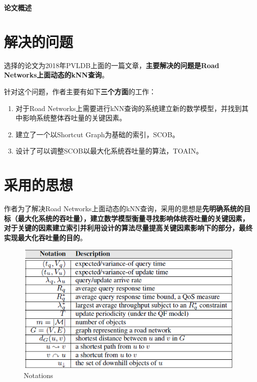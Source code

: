 \documentclass{ML}
\begin{document}
\maketitle

\tableofcontents
\newpage

\begin{center}
    \textbf{ 论文概述}
\end{center}

\section{解决的问题}
选择的论文\cite{toain}为2018年PVLDB上面的一篇文章，\textbf{主要解决的问题是Road Networks上面动态的kNN查询}。

针对这个问题，作者主要有如下\textbf{三个方面}的工作：
\begin{enumerate}
    \item 对于Road Networks上需要进行kNN查询的系统建立新的数学模型，并找到其中影响系统整体吞吐量的关键因素。
    \item 建立了一个以Shortcut Graph为基础的索引，SCOB。
    \item 设计了可以调整SCOB以最大化系统吞吐量的算法，TOAIN。
\end{enumerate}
\section{采用的思想}
作者为了解决Road Networks上面动态的kNN查询，采用的思想是\textbf{先明确系统的目标（最大化系统的吞吐量），建立数学模型衡量寻找影响体统吞吐量的关键因素，对于关键的因素建立索引并利用设计的算法尽量提高关键因素影响下的部分，最终实现最大化吞吐量的目的}。

\begin{figure}[htb]
	\centering
	\includegraphics[width=0.8\linewidth]{media/notations.png}
	\caption{Notations}\label{fig:notations}
\end{figure}
\end{document}
